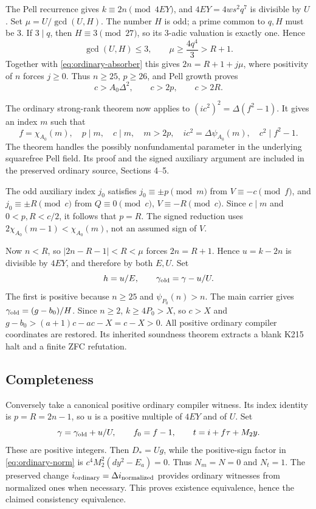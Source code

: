 The Pell recurrence gives $k\equiv2n\pmod {4EY}$, and
$4EY=4ws^2q^7$ is divisible by $U$. Set $\mu=U/\gcd(U,H)$.
The number $H$ is odd; a prime common to $q,H$ must be $3$.
If $3\mid q$, then $H\equiv3\pmod {27}$, so its $3$-adic valuation
is exactly one. Hence
\[
 \gcd(U,H)\le3,\qquad \mu\ge\frac{4q^4}{3}>R+1.
\]
Together with \eqref{eq:ordinary-absorber} this gives
$2n=R+1+j\mu$, where positivity of $n$ forces $j\ge0$.
Thus $n\ge25$, $p\ge26$, and Pell growth proves
\[
 c>A_0\Delta^2,\qquad c>2p,\qquad c>2R.
\]

The ordinary strong-rank theorem now applies to
$(ic^2)^2=\Delta(f^2-1)$. It gives an index $m$ such that
\[
 f=\chi_{A_0}(m),\quad p\mid m,\quad c\mid m,\quad m>2p,
 \quad ic^2=\Delta\psi_{A_0}(m),\quad c^2\mid f^2-1.
\]
The theorem handles the possibly nonfundamental parameter in the underlying
squarefree Pell field. Its proof and the signed auxiliary argument are
included in the preserved ordinary source, Sections 4--5.

The odd auxiliary index $j_0$ satisfies $j_0\equiv\pm p\pmod m$ from
$V\equiv-c\pmod f$, and $j_0\equiv\pm R\pmod c$ from
$Q\equiv0\pmod c$, $V\equiv-R\pmod c$. Since $c\mid m$ and
$0<p,R<c/2$, it follows that $p=R$. The signed reduction uses
$2\chi_{A_0}(m-1)<\chi_{A_0}(m)$, not an assumed sign of $V$.

Now $n<R$, so $|2n-R-1|<R<\mu$ forces $2n=R+1$. Hence
$u=k-2n$ is divisible by $4EY$, and therefore by both $E,U$. Set
\[
 h=u/E,\qquad \gamma_{\rm old}=\gamma-u/U.
\]
The first is positive because $n\ge25$ and $\psi_{P_0}(n)>n$.
The main carrier gives $\gamma_{\rm old}=(g-b_0)/H$.
Since $n\ge2$, $k\ge4P_0>X$, so $c>X$ and
$g-b_0>(a+1)c-ac-X=c-X>0$.
All positive ordinary compiler coordinates are restored. Its inherited
soundness theorem extracts a blank K215 halt and a finite ZFC refutation.

\subsection{Completeness}
Conversely take a canonical positive ordinary compiler witness. Its index
identity is $p=R=2n-1$, so $u$ is a positive multiple of $4EY$ and of $U$.
Set
\[
 \gamma=\gamma_{\rm old}+u/U,\qquad f_0=f-1,
 \qquad t=i+f\tau+M_2y.
\]
These are positive integers. Then $D_*=Ug$, while the positive-sign
factor in \eqref{eq:ordinary-norm} is
$c^4M_2^2(dy^2-E_a)=0$. Thus $N_m=N=0$ and $N_t=1$.
The preserved change $i_{\rm ordinary}=\Delta i_{\rm normalized}$
provides ordinary witnesses from normalized ones when necessary.
This proves existence equivalence, hence the claimed consistency equivalence.

